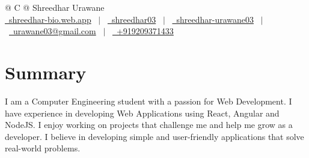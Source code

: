 \documentclass[a4paper,10pt]{article}
\begin{document}
\pagestyle{empty} 



\begin{tabularx}{\linewidth}{@{} C @{}}
\Huge{Shreedhar Urawane} \\[14pt]
\normalsize
\href{https://shreedhar-bio.web.app}{\raisebox{-0.05\height}\faGlobe \ shreedhar-bio.web.app} \ $|$ \ 
\href{https://github.com/shreedhar03}{\raisebox{-0.05\height}\faGithub\ shreedhar03} \ $|$ \ 
\href{https://www.linkedin.com/in/shreedhar-urawane03/}{\raisebox{-0.05\height}\faLinkedin\ shreedhar-urawane03} \ $|$ \ 
\href{mailto:urawane03@gmail.com}{\raisebox{-0.05\height}\faEnvelope \ urawane03@gmail.com} \ $|$ \ 
\href{tel:+919209371433}{\raisebox{-0.05\height}\faMobile \ +919209371433} \\[8pt]
\end{tabularx}


\section{Summary}

I am a Computer Engineering student with a passion for Web Development. I have experience in developing Web Applications using React, Angular and NodeJS. I enjoy working on projects that challenge me and help me grow as a developer. I believe in developing simple and user-friendly applications that solve real-world problems.


\end{document}
